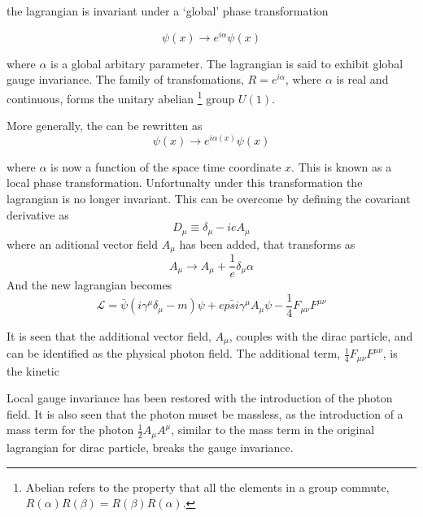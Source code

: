 the lagrangian is invariant under a `global' phase transformation

\begin{equation}
\psi(x) \to e^{i\alpha} \psi(x)
\label{eq:global}
\end{equation}

where $\alpha$ is a global arbitary parameter. The lagrangian is said to exhibit
global gauge invariance. The family of transfomations, $R =
e^{i \alpha}$, where $\alpha$ is real and continuous, forms the unitary
abelian \footnote{Abelian refers to the property that all the elements in a
group commute, $R(\alpha)R(\beta) = R(\beta)R(\alpha)$.}
group $U(1)$. 

More generally, the  can be rewritten as 
\begin{equation}
\psi(x) \to e^{i\alpha(x)} \psi(x)
\label{eq:local}
\end{equation}

where $\alpha$ is now a function of the space time coordinate $x$. This is known
as a local phase transformation. Unfortunalty under this transformation the
lagrangian is no longer invariant. This can be overcome by defining the
covariant derivative as 
\begin{equation}
D_{\mu} \equiv \delta_{\mu} - i e A_{\mu}
\end{equation}
where an aditional vector field $A_{\mu}$ has been added, that transforms as 
\begin{equation}
A_{\mu} \to A_{\mu} + \frac{1}{e} \delta_{\mu} \alpha
\end{equation}
And the new lagrangian becomes
\begin{equation}
\mathcal{L} = 
\bar{\psi}(i\gamma^{\mu}\delta_{\mu} - m)\psi + 
e \bar{psi} \gamma^{\mu} A_{\mu} \psi - 
\frac{1}{4} F_{\mu\nu} F^{\mu\nu}
\end{equation}

It is seen that the additional vector field, $A_{\mu}$, couples with the dirac
particle, and can be identified as the physical photon field. The additional
term, $\frac{1}{4} F_{\mu\nu} F^{\mu\nu}$, is the kinetic

Local gauge invariance has been restored with the introduction of the photon
field. It is also seen that the photon muset be massless, as the introduction of
a mass term for the photon $\frac{1}{2}A_{\mu}A^{\mu}$,
similar to the mass term in the original lagrangian for dirac particle, breaks
the gauge invariance.

